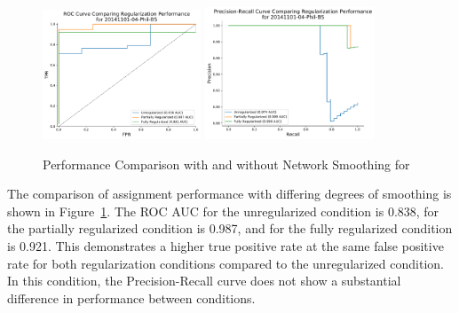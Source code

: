     \begin{figure}[!htb]
        \caption{Performance Comparison with and without Network Smoothing for \philbs
                 \label{fig:philbs_perf}}
        \centering
        \includegraphics[width=0.42\textwidth,valign=t]{figure/phil_bs_native_roc.pdf}
        \includegraphics[width=0.45\textwidth,valign=t]{figure/phil_bs_native_prec_rec.pdf}
    \end{figure}

    The comparison of assignment performance with differing degrees of smoothing is
    shown in Figure~\ref{fig:philbs_perf}. The ROC AUC for the unregularized condition is
    0.838, for the partially regularized condition is 0.987, and for the fully regularized
    condition is 0.921. This demonstrates a higher true positive rate at the same false positive
    rate for both regularization conditions compared to the unregularized condition. In
    this condition, the Precision-Recall curve does not show a substantial difference in
    performance between conditions.

